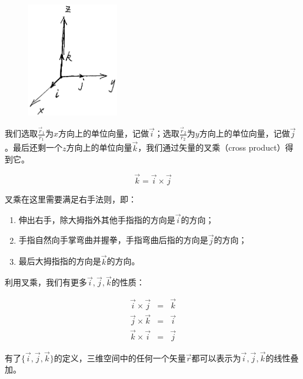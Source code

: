 \begin{figure}[htbp]
\begin{center}
\includegraphics[width=4cm]{Preface/cartesian.png}
\end{center}
\end{figure}

我们选取$\frac{\vec r_1}{r_1}$为$x$方向上的单位向量，记做$\vec i$；选取$\frac{\vec r_2}{r_2}$为$y$方向上的单位向量，记做$\vec j$。最后还剩一个$z$方向上的单位向量$\vec k$，我们通过矢量的叉乘（cross product）得到它。

\begin{equation}
\vec k = \vec i \times \vec j
\end{equation}

叉乘在这里需要满足右手法则，即：

\begin{enumerate}
\item 

伸出右手，除大拇指外其他手指指的方向是$\vec i$的方向；

\item

手指自然向手掌弯曲并握拳，手指弯曲后指的方向是$\vec j$的方向；

\item 

最后大拇指指的方向是$\vec k$的方向。

\end{enumerate}

利用叉乘，我们有更多$\vec i , \vec j , \vec k$的性质：

\begin{eqnarray}
\vec i \times \vec j & = & \vec k \\
\vec j \times \vec k & = & \vec i \\
\vec k \times \vec i & = & \vec j 
\end{eqnarray}

有了$\{ \vec i , \vec j , \vec k  \}$的定义，三维空间中的任何一个矢量$\vec r$都可以表示为$\vec i , \vec j , \vec k$的线性叠加。

